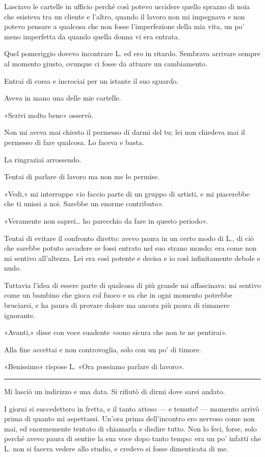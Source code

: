 Lasciavo le cartelle in ufficio perché così potevo uccidere quello sprazzo di noia che esisteva tra
un cliente e l'altro, quando il lavoro non mi impegnava e non potevo pensare a qualcosa che non
fosse l'imperfezione della mia vita, un po' meno imperfetta da quando quella donna vi era entrata.

Quel pomeriggio dovevo incontrare L. ed ero in ritardo. Sembrava arrivare sempre al momento giusto,
ovunque ci fosse da attuare un cambiamento.

Entrai di corsa e incrociai per un istante il suo sguardo.

Aveva in mano una delle mie cartelle.

«Scrivi molto bene» osservò.

Non mi aveva mai chiesto il permesso di darmi del tu; lei non chiedeva mai il permesso di fare
qualcosa. Lo faceva e basta.

La ringraziai arrossendo.

Tentai di parlare di lavoro ma non me lo permise.

«Vedi,» mi interruppe «io faccio parte di un gruppo di artisti, e mi piacerebbe che ti unissi a noi.
Sarebbe un enorme contributo».

«Veramente non saprei\dots{} ho parecchio da fare in questo periodo».

Tentai di evitare il confronto diretto: avevo paura in un certo modo di L., di ciò che sarebbe
potuto accadere se fossi entrato nel suo strano mondo; era come non mi sentivo all'altezza. Lei era
così potente e decisa e io così infinitamente debole e nudo.

Tuttavia l'idea di essere parte di qualcosa di più grande mi affascinava: mi sentivo come un bambino
che gioca col fuoco e sa che in ogni momento potrebbe bruciarsi, e ha paura di provare dolore ma
ancora più paura di rimanere ignorante.

«Avanti,» disse con voce suadente «sono sicura che non te ne pentirai».

Alla fine accettai e non controvoglia, solo con un po' di timore.

«Benissimo» rispose L. «Ora possiamo parlare di lavoro».

\plainbreak{1}

Mi lasciò un indirizzo e una data. Si rifiutò di dirmi dove sarei andato.

I giorni si succedettero in fretta, e il tanto atteso --- e temuto! --- momento arrivò prima di
quanto mi aspettassi. Un'ora prima dell'incontro ero nervoso come non mai, ed enormemente tentato di
chiamarla e disdire tutto. Non lo feci, forse, solo perché avevo paura di sentire la sua voce dopo
tanto tempo: era un po' infatti che L. non si faceva vedere allo studio, e credevo si fosse
dimenticata di me.

